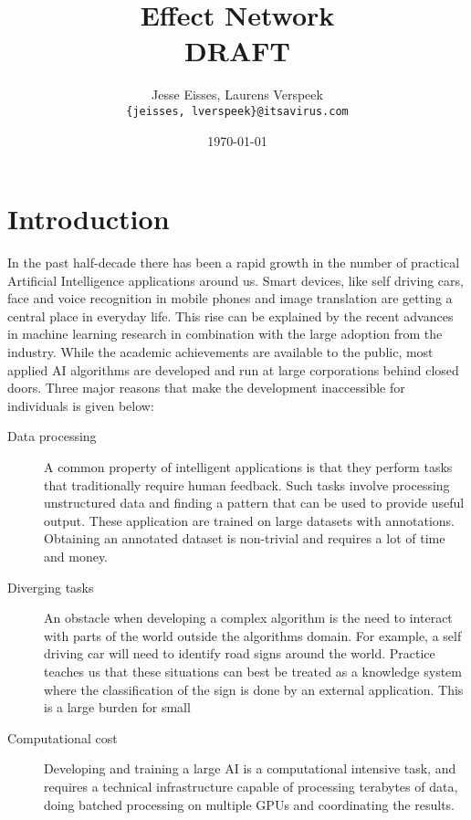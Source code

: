 \documentclass{article}
\title{Effect Network \\ \vspace{16pt} \large \textbf{DRAFT}}
\date{\today}
\author{Jesse Eisses, Laurens Verspeek \\
  \small \texttt{\{jeisses, lverspeek\}@itsavirus.com}}
\begin{document}
\maketitle

\begin{abstract}

\end{abstract}


\section{Introduction}

In the past half-decade there has been a rapid growth in the number of
practical Artificial Intelligence applications around us. Smart
devices, like self driving cars, face and voice recognition in mobile
phones and image translation are getting a central place in everyday
life. This rise can be explained by the recent advances in machine
learning research in combination with the large adoption from the
industry. While the academic achievements are available to the public,
most applied AI algorithms are developed and run at large corporations
behind closed doors. Three major reasons that make the development
inaccessible for individuals is given below:

\begin{description}
\item[Data processing] A common property of intelligent applications
  is that they perform tasks that traditionally require human
  feedback. Such tasks involve processing unstructured data and
  finding a pattern that can be used to provide useful output. These
  application are trained on large datasets with annotations. Obtaining
  an annotated dataset is non-trivial and requires a lot of time and
  money.
\item[Diverging tasks] An obstacle when developing a complex
  algorithm is the need to interact with parts of the world outside
  the algorithms domain. For example, a self driving car will need to
  identify road signs around the world. Practice teaches us that these
  situations can best be treated as a knowledge system where the
  classification of the sign is done by an external application. This
  is a large burden for small
\item[Computational cost] Developing and training a large AI is a
  computational intensive task, and requires a technical
  infrastructure capable of processing terabytes of data, doing
  batched processing on multiple GPUs and coordinating the results.
\end{description}
\end{document}
